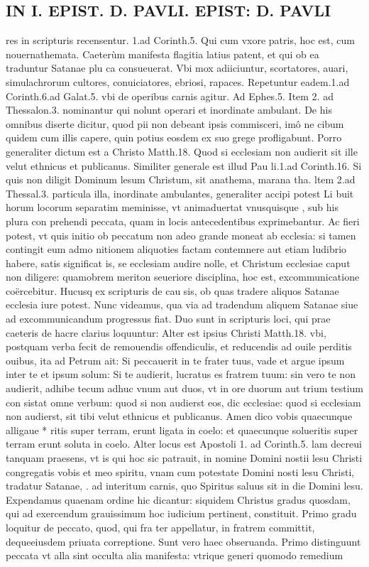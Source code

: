 \documentclass{article}
\begin{document}
\begin{pages}
\section*{IN I. EPIST. D. PAVLI. EPIST: D. PAVLI }
\marginpar{[ p.64 ]}\pstart res in scripturis recensentur. 1.ad Corinth.5. Qui cum vxore patris, hoc est, cum nouernathemata. Caeterùm manifesta flagitia latius patent, et qui ob ea traduntur Satanae plu ca consueuerat. Vbi mox adiiciuntur, scortatores, auari, simulachrorum cultores, conuiciatores, ebriosi, rapaces. Repetuntur eadem.1.ad Corinth.6.ad Galat.5. vbi de operibus carnis agitur. Ad Ephes.5. Item 2. ad Thessalon.3. nominantur qui nolunt operari et inordinate ambulant. De his omnibus diserte dicitur, quod pii non debeant ipsis commisceri, imô ne cibum quidem cum illis capere, quin potius eosdem ex suo grege profligabunt. Porro generaliter dictum est a Christo Matth.18. Quod si ecclesiam non audierit sit ille velut ethnicus et publicanus. Similiter generale est illud Pau li.1.ad Corinth.16. Si quis non diligit Dominum lesum Christum, sit anathema, marana tha. ltem 2.ad Thessal.3. particula illa, inordinate ambulantes, generaliter accipi potest Li buit horum locorum separatim meminisse, vt animaduertat vnusquisque , sub his plura con prehendi peccata, quam in locis antecedentibus exprimebantur. Ac fieri potest, vt quis initio ob peccatum non adeo grande moneat ab ecclesia: si tamen contingit eum admo nitionem aliquoties factam contemnere aut etiam ludibrio habere, satis significat is, se ecclesiam audire nolle, et Christum ecclesiae caput non diligere: quamobrem meriton seueriore disciplina, hoc est, excommunicatione coërcebitur. Hucusq ex scripturis de cau sis, ob quas tradere aliquos Satanae ecclesia iure potest.  \pend\pstart Nunc videamus, qua via ad tradendum aliquem Satanae siue ad excommunicandum progressus fiat. Duo sunt in scripturis loci, qui prae caeteris de hacre clarius loquuntur: Alter est ipsius Christi Matth.18. vbi, postquam verba fecit de remouendis offendiculis, et reducendis ad ouile perditis ouibus, ita ad Petrum ait: Si peccauerit in te frater tuus, vade et argue ipsum inter te et ipsum solum: Si te audierit, lucratus es fratrem tuum: sin vero te non audierit, adhibe tecum adhuc vnum aut duos, vt in ore duorum aut trium testium con sistat omne verbum: quod si non audierst eos, dic ecclesiae: quod si ecclesiam non   audierst, sit tibi velut ethnicus et publicanus. Amen dico vobis quaecunque alligaue * ritis super terram, erunt ligata in coelo: et quaecunque solueritis super terram erunt soluta in coelo. Alter locus est Apostoli 1. ad Corinth.5. lam decreui tanquam   praesens, vt is qui hoc sic patrauit, in nomine Domini nostii lesu Christi congregatis   vobis et meo spiritu, vnam cum potestate Domini nosti lesu Christi, tradatur Satanae, .  ad interitum carnis, quo Spiritus saluus sit in die Domini lesu. Expendamus quaenam ordine hic dicantur: siquidem Christus gradus quosdam, qui ad exercendum grauissimum hoc iudicium pertinent, constituit. Primo gradu loquitur de peccato, quod, qui fra ter appellatur, in fratrem committit, dequeeiusdem priuata correptione. Sunt vero haec obseruanda. Primo distinguunt peccata vt alla sint occulta alia manifesta: vtrique  generi quomodo remedium 
\end{pages}
\end{document}
